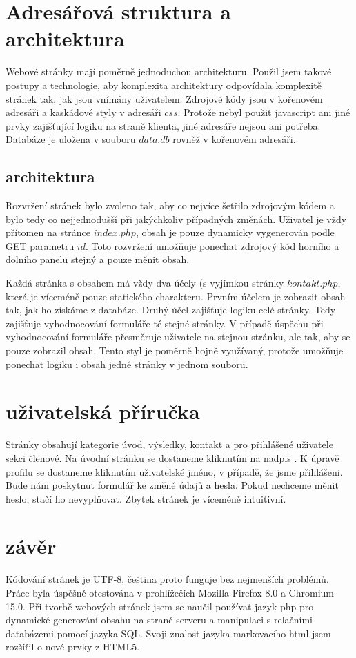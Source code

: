 \documentclass[12pt]{article}
\begin{document}
\section{Adresářová struktura a architektura}
Webové stránky mají poměrně jednoduchou architekturu. Použil jsem takové
postupy a technologie, aby komplexita architektury odpovídala komplexitě
stránek tak, jak jsou vnímány uživatelem. Zdrojové kódy jsou v kořenovém
adresáři a kaskádové styly v adresáři $css$. Protože nebyl použit javascript
ani jiné prvky zajišťující logiku na straně klienta, jiné adresáře nejsou ani
potřeba. Databáze je uložena v souboru $data.db$ rovněž v kořenovém adresáři.

\subsection{architektura}
Rozvržení stránek bylo zvoleno tak, aby co nejvíce šetřilo zdrojovým kódem
a bylo tedy co nejjednodušší při jakýchkoliv případných změnách. Uživatel je
vždy přítomen na stránce $index.php$, obsah je pouze dynamicky vygenerován
podle GET parametru $id$. Toto rozvržení umožňuje ponechat zdrojový kód horního
a dolního panelu stejný a pouze měnit obsah.

Každá stránka s obsahem má vždy dva účely (s vyjímkou stránky $kontakt.php$,
která je víceméně pouze statického charakteru. Prvním účelem je zobrazit obsah
tak, jak ho získáme z databáze. Druhý účel zajišťuje logiku celé stránky. Tedy
zajišťuje vyhodnocování formuláře té stejné stránky. V případě úspěchu při
vyhodnocování formuláře přesměruje uživatele na stejnou stránku, ale tak, aby
se pouze zobrazil obsah. Tento styl je poměrně hojně využívaný, protože
umožňuje ponechat logiku i obsah jedné stránky v jednom souboru.

\section{uživatelská příručka}
Stránky obsahují kategorie úvod, výsledky, kontakt a pro přihlášené uživatele
sekci členové. Na úvodní stránku se dostaneme kliknutím na nadpis .
K úpravě profilu se dostaneme kliknutím uživatelské jméno, v případě, že jsme
přihlášeni. Bude nám poskytnut formulář ke změně údajů a hesla. Pokud nechceme
měnit heslo, stačí ho nevyplňovat. Zbytek stránek je víceméně intuitivní.

\section{závěr}
Kódování stránek je UTF-8, čeština proto funguje bez nejmenších problémů.
Práce byla úspěšně otestována v prohlížečích Mozilla Firefox 8.0 a Chromium
15.0.  Při tvorbě webových stránek jsem se naučil používat jazyk php pro
dynamické generování obsahu na straně serveru a manipulaci s relačními
databázemi pomocí jazyka SQL. Svoji znalost jazyka markovacího html jsem
rozšířil o nové prvky z HTML5.
\end{document}

